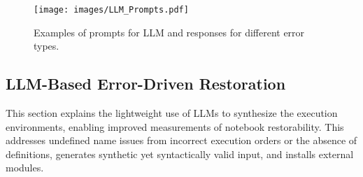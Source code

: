 


    

\begin{figure*}[t!] %
        \centerline{\texttt{[image: images/LLM\_Prompts.pdf]}}
        \caption{Examples of prompts for LLM and responses for different error types. }
        \label{fig:LLM-prompts}
\end{figure*}

    
    \subsection{LLM-Based Error-Driven Restoration}
        This section explains the lightweight use of LLMs to synthesize the execution environments, enabling improved measurements of notebook restorability. This addresses undefined name issues from incorrect execution orders or the absence of definitions, generates synthetic yet syntactically valid input, and installs external modules. 
        
